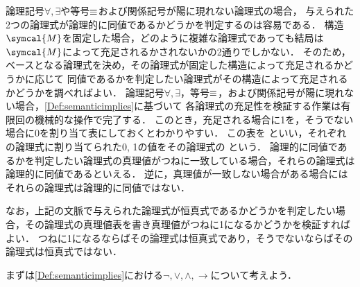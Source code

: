 論理記号\(\forall, \exists\)や等号\(\equiv\)および関係記号が陽に現れない論理式の場合，
与えられた2つの論理式が論理的に同値であるかどうかを判定するのは容易である．
構造\(\symcal{M}\)を固定した場合，どのように複雑な論理式であっても結局は\(\symcal{M}\)によって充足されるかされないかの2通りでしかない．
そのため，ベースとなる論理式を決め，その論理式が固定した構造によって充足されるかどうかに応じて
同値であるかを判定したい論理式がその構造によって充足されるかどうかを調べればよい．
論理記号\(\forall, \exists\)，等号\(\equiv\)，および関係記号が陽に現れない場合，\cref{Def:semanticimplies}に基づいて
各論理式の充足性を検証する作業は有限回の機械的な操作で完了する．
このとき，充足される場合に1を，そうでない場合に0を割り当て表にしておくとわかりやすい．
この表を%
%
といい，それぞれの論理式に割り当てられた0, 1の値をその論理式の%
%
という．
論理的に同値であるかを判定したい論理式の真理値がつねに一致している場合，それらの論理式は論理的に同値であるといえる．
逆に，真理値が一致しない場合がある場合にはそれらの論理式は論理的に同値ではない．

なお，上記の文脈で与えられた論理式が恒真式であるかどうかを判定したい場合，その論理式の真理値表を書き真理値がつねに1になるかどうかを検証すればよい．
つねに1になるならばその論理式は恒真式であり，そうでないならばその論理式は恒真式ではない．

まずは\cref{Def:semanticimplies}における\(\lnot, \lor, \land, \to\)について考えよう．


